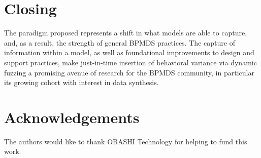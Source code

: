 \documentclass[12pt]{llncs}  %
\begin{document}
\section{Closing}
The paradigm proposed represents a shift in what models are able to capture,
and, as a result, the strength of general BPMDS practices. The capture of
information within a model, as well as foundational improvements
to design and support practices, make just-in-time insertion of behavioral
variance via dynamic fuzzing a promising avenue of research for the BPMDS
community, in particular its growing cohort with interest in data synthesis.
\par

\section*{Acknowledgements}
The authors would like to thank OBASHI Technology for helping to fund this work.


\end{document}
